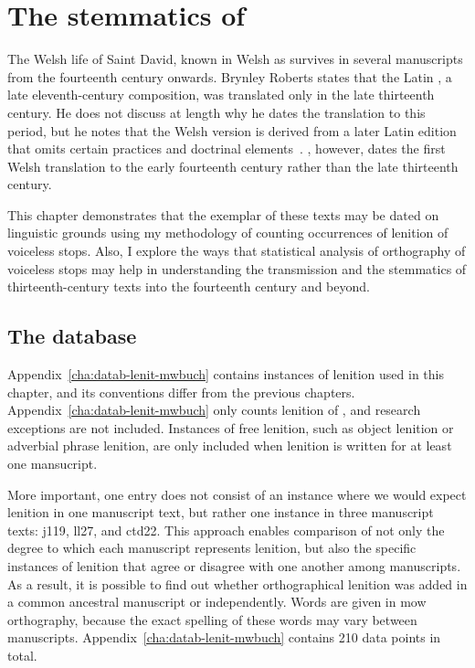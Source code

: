 \chapter{The stemmatics of }
\label{cha:stemm-mwbuch-dewi}
The Welsh life of Saint David, known in Welsh as  survives in several manuscripts from the fourteenth century onwards. Brynley Roberts states that the Latin , a late eleventh-century composition, was translated only in the late thirteenth century. He does not discuss at length why he dates the translation to this period, but he notes that the Welsh version is derived from a later Latin edition that omits certain practices and doctrinal elements~\autocite[218--219]{Rob_Ystoriaeu11}. \Textcite[liv]{Eva_Welsh88}, however, dates the first Welsh translation to the early fourteenth century rather than the late thirteenth century.

This chapter demonstrates that the exemplar of these texts may be dated on linguistic grounds using my methodology of counting occurrences of lenition of voiceless stops. Also, I explore the ways that statistical analysis of  orthography of voiceless stops may help in understanding the transmission and the stemmatics of thirteenth-century texts into the fourteenth century and beyond.

\section{The database}
\label{sec:database}

Appendix~\ref{cha:datab-lenit-mwbuch} contains instances of lenition used in this chapter, and its conventions differ from the previous chapters. Appendix~\ref{cha:datab-lenit-mwbuch} only counts lenition of , and research exceptions are not included. Instances of free lenition, such as object lenition or adverbial phrase lenition, are only included when lenition is written for at least one mansucript.

More important, one entry does not consist of an instance where we would expect lenition in one manuscript text, but rather one instance in three manuscript texts: \gls{j119}, \gls{ll27}, and \gls{ctd22}. This approach enables comparison of not only the degree to which each manuscript represents lenition, but also the specific instances of lenition that agree or disagree with one another among manuscripts. As a result, it is possible to find out whether orthographical lenition was added in a common ancestral manuscript or independently. Words are given in \gls{mow} orthography, because the exact spelling of these words may vary between manuscripts.  Appendix~\ref{cha:datab-lenit-mwbuch} contains 210 data points in total.

